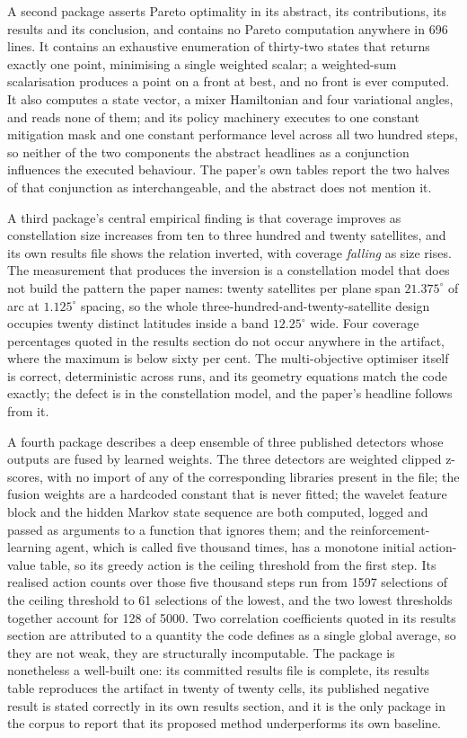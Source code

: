 \documentclass[sigconf,review]{acmart}
\begin{document}
A second package asserts Pareto optimality in its abstract, its contributions,
its results and its conclusion, and contains no Pareto computation anywhere in
696 lines. It contains an exhaustive enumeration of thirty-two states that
returns exactly one point, minimising a single weighted scalar; a weighted-sum
scalarisation produces a point on a front at best, and no front is ever
computed. It also computes a state vector, a mixer Hamiltonian and four
variational angles, and reads none of them; and its policy machinery executes
to one constant mitigation mask and one constant performance level across all
two hundred steps, so neither of the two components the abstract headlines as
a conjunction influences the executed behaviour. The paper's own tables report
the two halves of that conjunction as interchangeable, and the abstract does
not mention it.

A third package's central empirical finding is that coverage improves as
constellation size increases from ten to three hundred and twenty satellites,
and its own results file shows the relation inverted, with coverage
\emph{falling} as size rises. The measurement that produces the inversion is a
constellation model that does not build the pattern the paper names: twenty
satellites per plane span $21.375^{\circ}$ of arc at $1.125^{\circ}$ spacing,
so the whole three-hundred-and-twenty-satellite design occupies twenty
distinct latitudes inside a band $12.25^{\circ}$ wide. Four coverage
percentages quoted in the results section do not occur anywhere in the
artifact, where the maximum is below sixty per cent. The multi-objective
optimiser itself is correct, deterministic across runs, and its geometry
equations match the code exactly; the defect is in the constellation model,
and the paper's headline follows from it.

A fourth package describes a deep ensemble of three published detectors whose
outputs are fused by learned weights. The three detectors are weighted
clipped z-scores, with no import of any of the corresponding libraries present
in the file; the fusion weights are a hardcoded constant that is never fitted;
the wavelet feature block and the hidden Markov state sequence are both
computed, logged and passed as arguments to a function that ignores them; and
the reinforcement-learning agent, which is called five thousand times, has a
monotone initial action-value table, so its greedy action is the ceiling
threshold from the first step. Its realised action counts over those five
thousand steps run from 1597 selections of the ceiling threshold to 61
selections of the lowest, and the two lowest thresholds together account for
128 of 5000. Two correlation coefficients quoted in its results section are
attributed to a quantity the code defines as a single global average, so they
are not weak, they are structurally incomputable. The package is nonetheless a
well-built one: its committed results file is complete, its results table
reproduces the artifact in twenty of twenty cells, its published negative
result is stated correctly in its own results section, and it is the only
package in the corpus to report that its proposed method underperforms its own
baseline.
\end{document}

